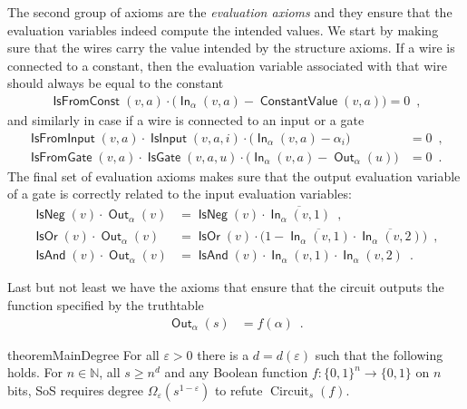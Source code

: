\documentclass[10pt,a4paper]{article}
\theoremstyle{plain}
\theoremstyle{remark}
\theoremstyle{definition}
\newcommand{\eps}{\varepsilon}
\newcommand{\eqcomma}{\enspace ,}
\newcommand{\eqperiod}{\enspace .}
\newcommand{\set}[1]{\{#1\}}
\newcommand{\N}{\mathbb{N}}
\newcommand{\vars}[1]{\mathsf{#1}}
\DeclareMathOperator{\circuit}{Circuit}
\DeclareMathOperator{\outwire}{\vars{Out}}
\DeclareMathOperator{\inwire}{\vars{In}}
\DeclareMathOperator{\isneg}{\vars{IsNeg}}
\DeclareMathOperator{\isand}{\vars{IsAnd}}
\DeclareMathOperator{\isor}{\vars{IsOr}}
\DeclareMathOperator{\isfromconst}{\vars{IsFromConst}}
\DeclareMathOperator{\isfromvar}{\vars{IsFromInput}}
\DeclareMathOperator{\isfromgate}{\vars{IsFromGate}}
\DeclareMathOperator{\constval}{\vars{ConstantValue}}
\DeclareMathOperator{\isvar}{\vars{IsInput}}
\DeclareMathOperator{\isgate}{\vars{IsGate}}
\begin{document}
The second group of axioms are the \emph{evaluation axioms} and they
ensure that the evaluation variables indeed compute the intended
values. We start by making sure that the wires carry the value
intended by the structure axioms. If a wire is connected to a
constant, then the evaluation variable associated with that wire
should always be equal to the constant
\begin{align}
  \label{eq:inwire-const}
  \isfromconst(v,a) \cdot
  \big( \inwire_{\alpha}(v,a) - \constval(v, a) \big) = 0 \eqcomma
\end{align}
and similarly in case if a wire is connected to an input or a gate
\begin{align}
  \label{eq:inwire-var}
  \isfromvar(v, a) \cdot \isvar(v, a, i) \cdot
  \big( \inwire_\alpha(v, a) - \alpha_i\big) &= 0
  \eqcomma\\
  \label{eq:inwire-gate}
  \isfromgate(v, a) \cdot \isgate(v, a, u) \cdot
  \big(\inwire_\alpha(v, a) - \outwire_\alpha(u)\big) &= 0 \eqperiod
\end{align}
The final set of evaluation axioms makes sure that the output
evaluation variable of a gate is correctly related to the input
evaluation variables:
\begin{align}
  \label{eq:ax-neg}
  \isneg(v) \cdot
  \outwire_{\alpha}(v)
  &=
    \isneg(v) \cdot
    \overline{\inwire_{\alpha}(v, 1)}\eqcomma\\
  \label{eq:ax-or}
  \isor(v) \cdot
  \outwire_{\alpha}(v)
  &=
    \isor(v)
    \cdot \big(
    1 -
    \overline{\inwire_{\alpha}(v, 1)} \cdot
    \overline{\inwire_{\alpha}(v, 2)}
    \big) \eqcomma\\
  \label{eq:ax-and}
  \isand(v) \cdot
  \outwire_{\alpha}(v)
  &=
    \isand(v) \cdot
    \inwire_{\alpha}(v, 1) \cdot
    \inwire_{\alpha}(v, 2) \eqperiod
\end{align}

Last but not least we have the axioms that ensure that the circuit
outputs the function specified by the truthtable
\begin{align}
  \label{eq:ax-correct}
  \outwire_{\alpha}(s) &= f(\alpha) \eqperiod
\end{align}

\begin{restatable}{theorem}{MainDegree}
  \label{thm:main-degree}
  For all $\eps > 0$ there is a $d = d(\eps)$ such that the following
  holds.  For $n \in \N$, all $s \ge n^{d}$ and any Boolean function
  $f:\set{0,1}^{n} \rightarrow \set{0,1}$ on $n$ bits, SoS requires
  degree $\Omega_\eps(s^{1-\eps})$ to refute $\circuit_s(f)$.
\end{restatable}
\end{document}
